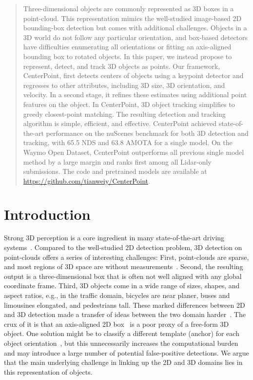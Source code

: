 \documentclass[final]{cvpr}
\begin{document}
\begin{abstract}
Three-dimensional objects are commonly represented as 3D boxes in a point-cloud.
This representation mimics the well-studied image-based 2D bounding-box detection but comes with additional challenges.
Objects in a 3D world do not follow any particular orientation, and box-based detectors have difficulties enumerating all orientations or fitting an axis-aligned bounding box to rotated objects.
In this paper, we instead propose to represent, detect, and track 3D objects as points.
Our framework, CenterPoint, first detects centers of objects using a keypoint detector and regresses to other attributes, including 3D size, 3D orientation, and velocity.
In a second stage, it refines these estimates using additional point features on the object.
In CenterPoint, 3D object tracking simplifies to greedy closest-point matching.
The resulting detection and tracking algorithm is simple, efficient, and effective.
CenterPoint achieved state-of-the-art performance on the nuScenes benchmark for both 3D detection and tracking, with 65.5 NDS and 63.8 AMOTA for a single model.
On the Waymo Open Dataset, CenterPoint outperforms all previous single model method by a large margin and ranks first among all Lidar-only submissions.
The code and pretrained models are available at \textcolor{magenta}{\url{https://github.com/tianweiy/CenterPoint}}.
\end{abstract}

\section{Introduction}

Strong 3D perception is a core ingredient in many state-of-the-art driving systems~\cite{bansal2018chauffeurnet,wang2019monocular}.
Compared to the well-studied 2D detection problem, 3D detection on point-clouds offers a series of interesting challenges:
First, point-clouds are sparse, and most regions of 3D space are without measurements~\cite{hu2019exploiting}.
Second, the resulting output is a three-dimensional box that is often not well aligned with any global coordinate frame.
Third, 3D objects come in a wide range of sizes, shapes, and aspect ratios, e.g., in the traffic domain, bicycles are near planer, buses and limousines elongated, and pedestrians tall.
These marked differences between 2D and 3D detection made a transfer of ideas between the two domain harder~\cite{shi2019pointrcnn,yang20203dssd,simony2018complex}.
The crux of it is that an axis-aligned 2D box~\cite{girshick2014rich,girshick2015fast} is a poor proxy of a free-form 3D object.
One solution might be to classify a different template (anchor) for each object orientation~\cite{yang2019scrdet, yang2019r3det},
but this unnecessarily increases the computational burden and may introduce a large number of potential false-positive detections.
We argue that the main underlying challenge in linking up the 2D and 3D domains lies in this representation of objects. 
\end{document}
